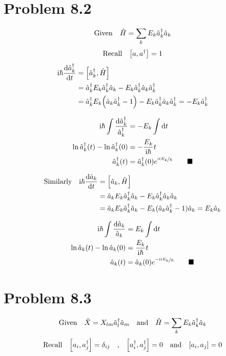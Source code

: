 \documentclass{article}
\begin{document}
\section*{Problem 8.2}
 
\[\qq*{Given} \hat{H}=\sum_k E_k \hat{a}_k^\dagger \hat{a}_k \] 
\[\qq*{Recall} \qty[a,a^\dagger]=1\]
\begin{align*}
\text{i}\hbar\dv{\hat{a}_k^\dagger }{t}&= \qty[\hat{a}_k^\dagger ,\hat{H}]\\
&=\hat{a}_k^\dagger E_{k}\hat{a}_k^\dagger\hat{a}_k-E_{k}\hat{a}_k^\dagger\hat{a}_k\hat{a}_k^\dagger \\
&=\hat{a}_k^\dagger E_{k}\qty(\hat{a}_k\hat{a}_k^\dagger-1)-E_{k}\hat{a}_k^\dagger\hat{a}_k\hat{a}_k^\dagger =-E_{k}\hat{a}_k^\dagger 
\end{align*}

\begin{align*}
\text{i}\hbar\int\frac{\dd{\hat{a}_k^\dagger }}{\hat{a}_k^\dagger}&=-E_{k}\int\dd{t} \\
\ln{\hat{a}_k^\dagger(t)}-\ln{\hat{a}_k^\dagger(0)}&=-\frac{E_{k}}{\text{i}\hbar}t \\
\hat{a}_k^\dagger(t)&=\hat{a}_k^\dagger(0)e^{\nicefrac{\text{i}tE_{k}}{\hbar}}\qquad\blacksquare 
\end{align*}

\begin{align*}
\qq*{Similarly} \text{i}\hbar\dv{\hat{a}_k }{t}&= \qty[\hat{a}_k ,\hat{H}]\\
&=\hat{a}_k E_{k}\hat{a}_k^\dagger\hat{a}_k-E_{k}\hat{a}_k^\dagger\hat{a}_k\hat{a}_k \\
&=\hat{a}_k E_{k}\hat{a}_k^\dagger\hat{a}_k-E_{k}(\hat{a}_k\hat{a}_k^\dagger-1)\hat{a}_k =E_{k}\hat{a}_k
\end{align*}

\begin{align*}
\text{i}\hbar\int\frac{\dd{\hat{a}_k }}{\hat{a}_k}&=E_{k}\int\dd{t} \\
\ln{\hat{a}_k(t)}-\ln{\hat{a}_k(0)}&=\frac{E_{k}}{\text{i}\hbar}t \\
\hat{a}_k(t)&=\hat{a}_k(0)e^{\nicefrac{-\text{i}tE_{k}}{\hbar}}\qquad\blacksquare 
\end{align*}


\section*{Problem 8.3}

\[\qq*{Given} \hat{X}= X_{lm}\hat{a}_l^\dagger\hat{a}_m\qq{and}\hat{H}=\sum_k E_k \hat{a}_k^\dagger \hat{a}_k\] 
\[\qq*{Recall} \qty[a_i,a_j^\dagger]=\delta_{ij}\qq{,}\qty[a_i^\dagger,a_j^\dagger]=0\qq{and}\qty[a_i,a_j]=0\]
\end{document}
